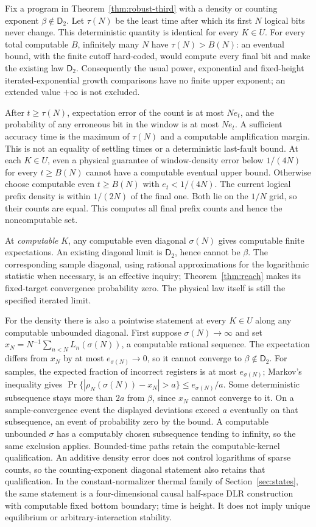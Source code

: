 Fix a program in Theorem~\ref{thm:robust-third} with a density or
counting exponent $\beta\notin\mathsf D_2$. Let $\tau(N)$ be the
least time after which its first $N$ logical bits never change.
This deterministic quantity is identical for every $K\in U$.
For every total computable $B$, infinitely many $N$ have
$\tau(N)>B(N)$: an eventual bound, with the finite cutoff hard-coded,
would compute every final bit and make the existing law
$\mathsf D_2$. Consequently the usual power, exponential and
fixed-height iterated-exponential growth comparisons have no finite
upper exponent; an extended value $+\infty$ is not excluded.

After $t\geq\tau(N)$, expectation error of the count is at most
$Ne_t$, and the probability of any erroneous bit in the window is
at most $Ne_t$. A sufficient accuracy time is the maximum of
$\tau(N)$ and a computable amplification margin. This is not an
equality of settling times or a deterministic last-fault bound.
At each $K\in U$, even a physical guarantee of window-density error
below $1/(4N)$ for every $t\geq B(N)$ cannot have a computable
eventual upper bound. Otherwise choose computable even $t\geq B(N)$
with $e_t<1/(4N)$. The current logical prefix density is within
$1/(2N)$ of the final one. Both lie on the $1/N$ grid, so their
counts are equal. This computes all final prefix counts and hence
the noncomputable set.

At \emph{computable} $K$, any computable even diagonal $\sigma(N)$
gives computable finite expectations. An existing diagonal limit
is $\mathsf D_2$, hence cannot be $\beta$. The corresponding sample
diagonal, using rational approximations for the logarithmic statistic
when necessary, is an effective inquiry; Theorem~\ref{thm:reach}
makes its fixed-target convergence probability zero. The physical
law itself is still the specified iterated limit.

For the density there is also a pointwise statement at every $K\in U$
along any computable unbounded diagonal. First suppose
$\sigma(N)\to\infty$ and set
$x_N=N^{-1}\sum_{n<N}L_n(\sigma(N))$, a computable rational sequence.
The expectation differs from $x_N$ by at most $e_{\sigma(N)}\to0$,
so it cannot converge to $\beta\notin\mathsf D_2$. For samples,
the expected fraction of incorrect registers is at most
$e_{\sigma(N)}$; Markov's inequality gives
$\Pr\{|\rho_N(\sigma(N))-x_N|>a\}\leq e_{\sigma(N)}/a$.
Some deterministic subsequence stays more than $2a$ from $\beta$,
since $x_N$ cannot converge to it. On a sample-convergence event
the displayed deviations exceed $a$ eventually on that subsequence,
an event of probability zero by the bound. A computable unbounded
$\sigma$ has a computably chosen subsequence tending to infinity,
so the same exclusion applies. Bounded-time paths retain the
computable-kernel qualification. An additive density error does not
control logarithms of sparse counts, so the counting-exponent
diagonal statement also retains that qualification.
In the constant-normalizer thermal family of Section~\ref{sec:states},
the same statement is a four-dimensional causal half-space DLR
construction with computable fixed bottom boundary; time is height.
It does not imply unique equilibrium or arbitrary-interaction stability.

